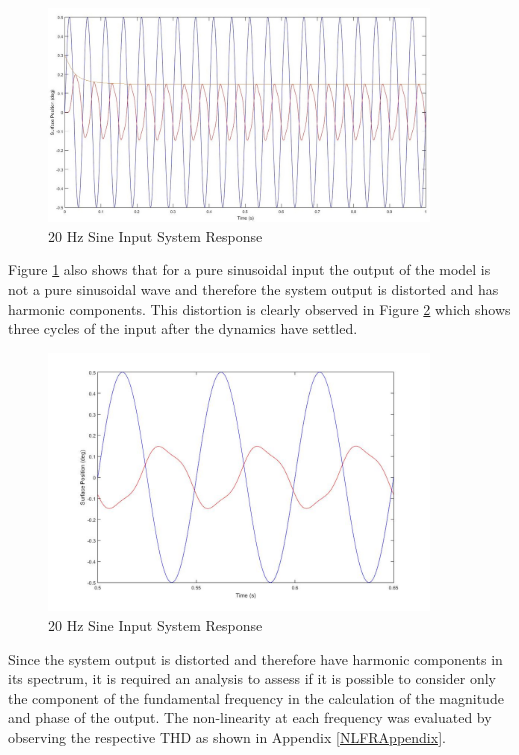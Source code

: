 \begin{figure}[H]
	\centering
	\centerline{\includegraphics[width=0.9\textwidth]{Figuras/4.DynamicStifinessOptimizationAlgorithm/4-3-2-1-20HzTimeResponse.jpg}}
	\caption{20 Hz Sine Input System Response }
	\label{fig:4_3_2_1_20HzTimeResponse}
\end{figure}

Figure \ref{fig:4_3_2_1_20HzTimeResponse} also shows that for a pure sinusoidal input the output of the model is not a pure sinusoidal wave and therefore the system output is distorted and has harmonic components. This distortion is clearly observed in Figure \ref{fig:4_3_2_1_20HzTimeResponseZoom} which shows three cycles of the input after the dynamics have settled.

\begin{figure}[H]
	\centering
	\centerline{\includegraphics[width=0.9\textwidth]{Figuras/4.DynamicStifinessOptimizationAlgorithm/4-3-2-1-20HzTimeResponseZoom.jpg}}
	\caption{20 Hz Sine Input System Response }
	\label{fig:4_3_2_1_20HzTimeResponseZoom}
\end{figure}

Since the system output is distorted and therefore have harmonic components in its spectrum, it is required an analysis to assess if it is possible to consider only the component of the fundamental frequency in the calculation of the magnitude and phase of the output. The non-linearity at each frequency was evaluated by observing the respective THD as shown in Appendix \ref{NLFRAppendix}.

